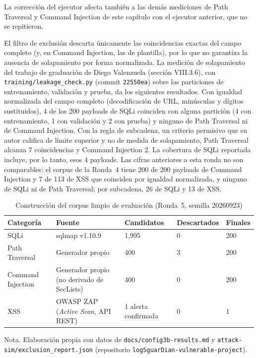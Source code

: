 La corrección del ejecutor afecta también a las demás mediciones de Path Traversal y Command
Injection de este capítulo con el ejecutor anterior, que no se repitieron.

El filtro de exclusión descarta únicamente las coincidencias exactas del campo completo (y, en
Command Injection, las de plantilla), por lo que no garantiza la ausencia de solapamiento por
forma normalizada. La medición de solapamiento del trabajo de graduación de Diego Valenzuela \cite{valenzuela2026ia}
(sección VIII.3.6), con \texttt{training/leakage\_check.py} (commit \texttt{22550ea}) sobre las
particiones de entrenamiento, validación y prueba, da los siguientes resultados. Con igualdad
normalizada del campo completo (decodificación de URL, minúsculas y dígitos sustituidos), 4 de los
200 payloads de SQLi coinciden con alguna partición (4 con entrenamiento, 1 con validación y 2
con prueba) y ninguno de Path Traversal ni de Command Injection. Con la regla de subcadena, un
criterio permisivo que su autor califica de límite superior y no de medida de solapamiento, Path
Traversal alcanza 7 coincidencias y Command Injection 2. La cobertura de SQLi reportada incluye,
por lo tanto, esos 4 payloads. Las cifras anteriores a esta ronda no son comparables: el corpus
de la Ronda~4 tiene 200 de 200 payloads de Command Injection y 7 de 113 de XSS que coinciden por
igualdad normalizada, y ninguno de SQLi ni de Path Traversal; por subcadena, 26 de SQLi y 13 de
XSS.

\begin{table}[H]
\centering
\small
\begin{tabular}{|L{2.7cm}|L{4.2cm}|L{1.8cm}|L{1.8cm}|L{1.4cm}|}
\hline
\textbf{Categoría} & \textbf{Fuente} & \textbf{Candidatos} & \textbf{Descartados} & \textbf{Finales} \\ \hline
SQLi & sqlmap v1.10.9 & 1{,}995 & 0 & 200 \\ \hline
Path Traversal & Generador propio & 400 & 3 & 200 \\ \hline
Command Injection & Generador propio (no derivado de SecLists) & 400 & 0 & 200 \\ \hline
XSS & OWASP ZAP (\textit{Active Scan}, API REST) & 1 alerta confirmada & 0 & 1 \\ \hline
\end{tabular}
\caption[Construcción del corpus limpio]{Construcción del corpus limpio de evaluación (Ronda~5, semilla 20260923)}
\label{tab:res-corpus}
\end{table}
{\footnotesize Nota. Elaboración propia con datos de \texttt{docs/config3b-results.md} y
\texttt{attack-sim/exclusion\_report.json} (repositorio \texttt{logSguarDian-vulnerable-project}).}


